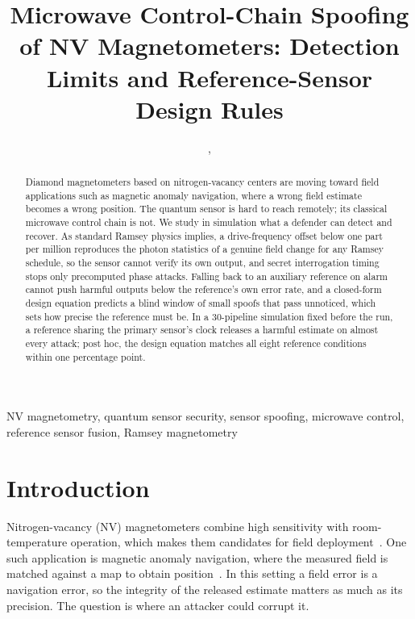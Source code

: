 \documentclass[conference,9pt]{IEEEtran}
\title{Microwave Control-Chain Spoofing of NV Magnetometers:
Detection Limits and Reference-Sensor Design Rules}
\author{
    \IEEEauthorblockN{Sounak Bhowmik and Himanshu Thapliyal}
    \IEEEauthorblockA{Department of Electrical and Computer Engineering\\
        Southern Methodist University, Dallas, TX, USA}
    \email{sbhowmik@smu.edu}, \email{hthapliyal@smu.edu}
}
\begin{document}
\maketitle

\begin{abstract}
Diamond magnetometers based on nitrogen-vacancy centers are moving toward field applications
such as magnetic anomaly navigation, where a wrong field estimate becomes a wrong position. The quantum sensor is hard to reach remotely; its classical microwave control chain is not. We study in simulation what a defender can detect and recover. As standard Ramsey physics implies, a drive-frequency offset below one part per million reproduces the photon statistics of a genuine field change for any Ramsey
schedule, so the sensor cannot verify its own output, and secret interrogation timing stops only
precomputed phase attacks. Falling back to an auxiliary reference on alarm cannot push harmful outputs below the reference's own
error rate, and a closed-form design equation
predicts a blind window of small spoofs that pass unnoticed, which sets how precise the reference
must be. In a 30-pipeline simulation fixed before the run, a reference sharing the primary sensor's clock
releases a harmful estimate on almost every attack; post hoc, the design equation matches all eight
reference conditions within one percentage point.
\end{abstract}

\begin{IEEEkeywords}
NV magnetometry, quantum sensor security, sensor spoofing, microwave control, reference sensor
fusion, Ramsey magnetometry
\end{IEEEkeywords}

\section{Introduction}
\label{sec:intro}

Nitrogen-vacancy (NV) magnetometers combine high sensitivity with room-temperature operation,
which makes them candidates for field deployment~\cite{barry2020sensitivity}. One such
application is magnetic anomaly navigation, where the measured field is matched against a map to
obtain position~\cite{canciani2016magnav}. In this setting a field error is a navigation error,
so the integrity of the released estimate matters as much as its precision. The question is
where an attacker could corrupt it.
\end{document}
